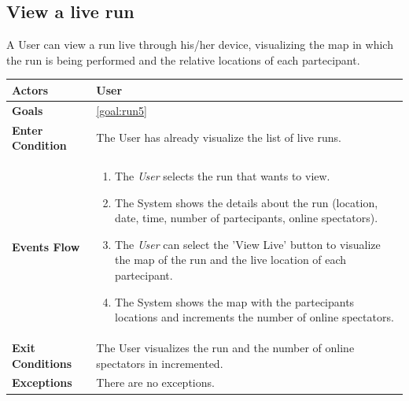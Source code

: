   \subsection{View a live run}
A User can view a run live through his/her device, visualizing the map in which the run is being performed and the relative locations of each partecipant.

\begin{table}[H]
	\centering
    
    \begin{tabular}{|p{3.5cm}|p{10.3cm}|}
    
    \hline
    \textbf{\large{Actors}}  			& \tabitem User 	\\
    				 					
    \hline
    \textbf{\large{Goals}} 				& \ref{goal:run5}\\
    
    \hline
    \textbf{\large{Enter Condition}}	& The User has already visualize the list of live runs.\\
    
    \hline
    \textbf{\large{Events Flow}}		& \begin{enumerate}[leftmargin=0.5cm]
                                          	\item The \emph{User}  selects the run that wants to view.
                                            \item The System shows the details about the run (location, date, time, number of partecipants, online spectators).
                                             \item The \emph{User} can select the 'View Live' button to visualize the map of the run and the live location of each partecipant.
                                            \item The System shows the map with the partecipants locations and increments the number of online spectators.
                                           
                                          \end{enumerate}
    										\\
    \hline
    \textbf{\large{Exit Conditions}}    & The User visualizes the run and the number of online spectators in incremented.  \\
    
    \hline
    \textbf{\large{Exceptions}} 		& There are no exceptions. \\
    
    \hline
    
    
    \end{tabular}
	
\end{table}

